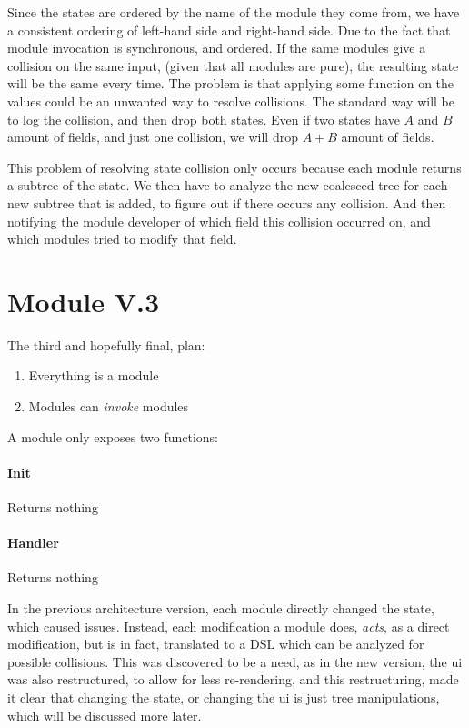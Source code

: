 Since the states are ordered by the name of the module they come from, we
have a consistent ordering of left-hand side and right-hand side. Due to the
fact that module invocation is synchronous, and ordered. If the same modules
give a collision on the same input, (given that all modules are pure), the
resulting state will be the same every time. The problem is that applying some
function on the values could be an unwanted way to resolve collisions. The
standard way will be to log the collision, and then drop both states. Even
if two states have $A$ and $B$ amount of fields, and just one collision, we will
drop $A + B$ amount of fields.

This problem of resolving state collision only occurs because each module
returns a subtree of the state. We then have to analyze the new coalesced tree
for each new subtree that is added, to figure out if there occurs any collision.
And then notifying the module developer of which field this collision occurred
on, and which modules tried to modify that field.

\section{Module V.3} \label{sec:moD3}

The third and hopefully final, plan:

\begin{enumerate}
  \item Everything is a module
  \item Modules can \textit{invoke} modules
\end{enumerate}

A module only exposes two functions:

\paragraph{Init} Returns nothing

\paragraph{Handler} Returns nothing

In the previous architecture version, each module directly changed the state,
which caused issues. Instead, each modification a module does, \textit{acts}, as
a direct modification, but is in fact, translated to a DSL which can be analyzed
for possible collisions. This was discovered to be a need, as in the new
version, the \gls{ui} was also restructured, to allow for less re-rendering, and
this restructuring, made it clear that changing the state, or changing the
\gls{ui} is just tree manipulations, which will be discussed more later.

